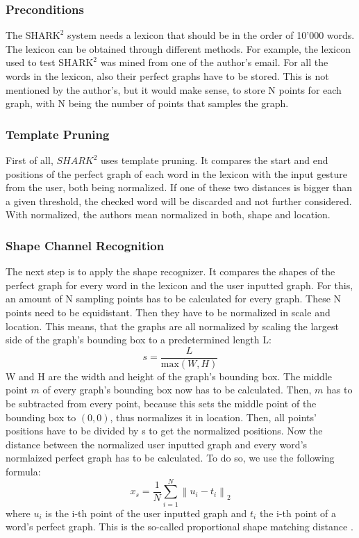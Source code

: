 \subsubsection{Preconditions}
The $\text{SHARK}^2$ system needs a lexicon that should be in the order of 10'000 words. The lexicon can be obtained through different methods. For example, the lexicon used to test $\text{SHARK}^2$ was mined from one of the author's email. For all the words in the lexicon, also their perfect graphs have to be stored. This is not mentioned by the author's, but it would make sense, to store N points for each graph, with N being the number of points that samples the graph.\\

\subsubsection{Template Pruning}
First of all, $SHARK^2$ uses template pruning. It compares the start and end positions of the perfect graph of each word in the lexicon with the input gesture from the user, both being normalized. If one of these two distances is bigger than a given threshold, the checked word will be discarded and not further considered. With normalized, the authors mean normalized in both, shape and location.\\

\subsubsection{Shape Channel Recognition}
The next step is to apply the shape recognizer. It compares the shapes of the perfect graph for every word in the lexicon and the user inputted graph. For this, an amount of N sampling points has to be calculated for every graph. These N points need to be equidistant. Then they have to be normalized in scale and location. This means, that the graphs are all normalized by scaling the largest side of the graph's bounding box to a predetermined length L: 
\begin{equation}
    s = \frac{L}{\text{max}(W,H)}
\end{equation}
W and H are the width and height of the graph's bounding box. The middle point $m$ of every graph's bounding box now has to be calculated. Then, $m$ has to be subtracted from every point, because this sets the middle point of the bounding box to $(0,0)$, thus normalizes it in location. Then, all points' positions have to be divided by s to get the normalized positions. Now the distance between the normalized user inputted graph and every word's normlaized perfect graph has to be calculated. To do so, we use the following formula:
\begin{equation}
    x_s = \frac{1}{N}\sum_{i = 1}^{N}\left\lVert u_i - t_i\right\rVert_2
\end{equation}
where $u_i$ is the i-th point of the user inputted graph and $t_i$ the i-th point of a word's perfect graph. This is the so-called proportional shape matching distance \cite{Kristensson2004SHARK2AL}.

